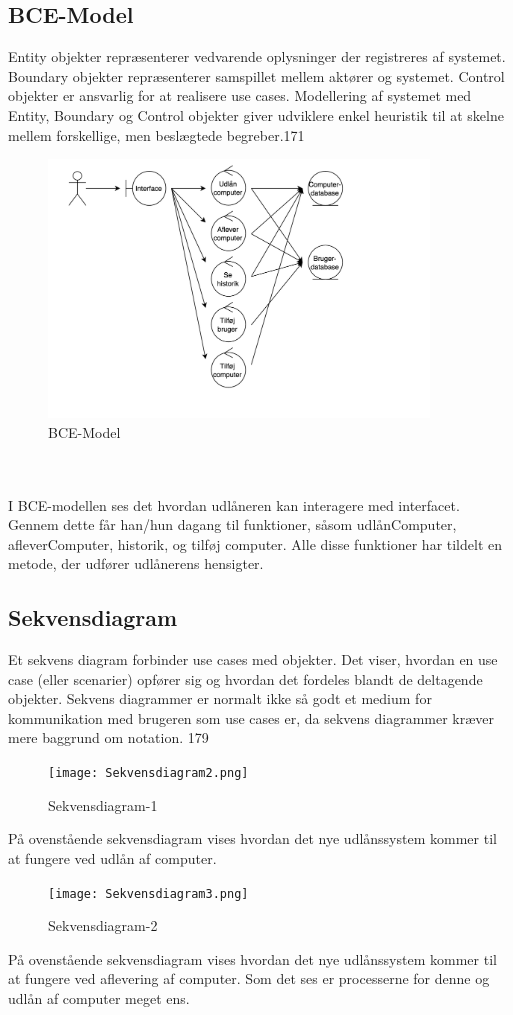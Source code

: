 \documentclass[a4paper]{article}
\begin{document}
\subsection{BCE-Model}
Entity objekter repræsenterer vedvarende oplysninger der registreres af systemet. Boundary objekter repræsenterer samspillet mellem aktører og systemet. Control objekter er ansvarlig for at realisere use cases. Modellering af systemet med Entity, Boundary og Control objekter giver udviklere enkel heuristik til at skelne mellem forskellige, men beslægtede begreber.\cite{OOSE}{171}
\begin{figure}[h!]
\includegraphics[width=0.9\textwidth]{BCE.png}
  \caption{BCE-Model}
  \centering
\end{figure} \\ \\
I BCE-modellen ses det hvordan udlåneren kan interagere med interfacet. Gennem dette får han/hun dagang til funktioner, såsom udlånComputer, afleverComputer, historik, og tilføj computer. Alle disse funktioner har tildelt en metode, der udfører udlånerens hensigter.\\
\subsection{Sekvensdiagram}
Et sekvens diagram forbinder use cases med objekter. Det viser, hvordan en use case (eller scenarier) opfører sig og hvordan det fordeles blandt de deltagende objekter. Sekvens diagrammer er normalt ikke så godt et medium for kommunikation med brugeren som use cases er, da sekvens diagrammer kræver mere baggrund om notation. \cite{OOSE}{179} \\
\begin{figure}[h!]
\texttt{[image: Sekvensdiagram2.png]}
  \caption{Sekvensdiagram-1}
  \centering
\end{figure}
På ovenstående sekvensdiagram vises hvordan det nye udlånssystem kommer til at fungere ved udlån af computer. \\
\newpage
\begin{figure}[h!]
\texttt{[image: Sekvensdiagram3.png]}
  \caption{Sekvensdiagram-2}
  \centering
\end{figure}
På ovenstående sekvensdiagram vises hvordan det nye udlånssystem kommer til at fungere ved aflevering af computer. Som det ses er processerne for denne og udlån af computer meget ens.
\newpage
\end{document}
